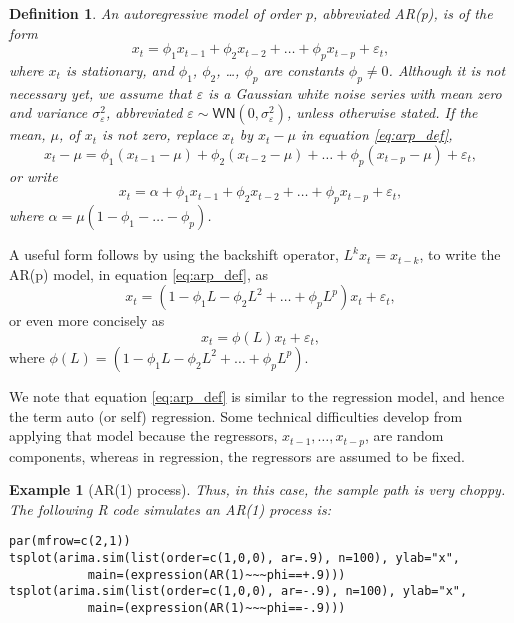 \documentclass[
paper=128mm:96mm, %
fontsize=9.5pt, %
pagesize, %
parskip=half-, %
]{scrartcl} %
\theoremstyle{mythmstyle} %
\newtheorem{definition}[theorem]{Definition} %
\newtheorem{example}[theorem]{Example} %
\begin{document}
\begin{definition}
An autoregressive model of order $p$, abbreviated AR(p), is of the form
%
\begin{equation}
\label{eq:arp_def}
x_t=\phi_1x_{t-1}+\phi_2x_{t-2} +\dots+\phi_px_{t-p} +\varepsilon_t,
\end{equation}
%
where $x_t$ is stationary, and $\phi_1$, $\phi_2$, \dots, $\phi_p$ are constants $\phi_p\neq 0$. 
%
Although it is not necessary yet, we assume that $\varepsilon$ is a Gaussian white noise series with mean zero and variance $\sigma_\varepsilon^2$, abbreviated $\varepsilon\sim\mathsf{WN}\left(0,\sigma_\varepsilon^2\right)$, unless otherwise stated. If the mean, $\mu$, of $x_t$ is not zero, replace $x_t$ by $x_t-\mu$ in equation \eqref{eq:arp_def},
%
\begin{equation}
\label{eq:arp_def_demean}
x_t-\mu=\phi_1\left(x_{t-1}-\mu\right)+\phi_2\left(x_{t-2}-\mu\right) +\dots+\phi_p\left(x_{t-p}-\mu\right)+\varepsilon_t,
\end{equation}
%
or write
%
\begin{equation}
\label{eq:arp_def_2}
x_t=\alpha+\phi_1x_{t-1}+\phi_2x_{t-2} +\dots+\phi_px_{t-p} +\varepsilon_t,
\end{equation}
%
where $\alpha=\mu\left(1-\phi_1-\dots-\phi_p\right)$.
\end{definition}
\clearpage

A useful form follows by using the backshift operator, $L^k x_t = x_{t-k}$, to write the AR(p) model, in equation \eqref{eq:arp_def}, as
%
\begin{equation*}
x_t=\left(1-\phi_1L-\phi_2 L^2+\dots+\phi_pL^p\right)x_t+\varepsilon_t,
\end{equation*}
%
or even more concisely as
%
\begin{equation*}
x_t=\phi\left(L\right)x_t+\varepsilon_t,
\end{equation*}
%
where $\phi\left(L\right)=\left(1-\phi_1L-\phi_2 L^2+\dots+\phi_pL^p\right)$.

We note that equation \eqref{eq:arp_def} is similar to the regression model, and hence the term auto (or self) regression. Some technical difficulties develop from applying that model because the regressors, $x_{t-1},\dots,x_{t-p}$, are random components, whereas in regression, the regressors are assumed to be fixed. 
\clearpage


\begin{example}[AR(1) process]

Thus, in this case, the sample path is very choppy. The following R code simulates an AR(1) process is:

\begin{lstlisting}[belowskip=-0.8 \baselineskip]
par(mfrow=c(2,1))
tsplot(arima.sim(list(order=c(1,0,0), ar=.9), n=100), ylab="x",
           main=(expression(AR(1)~~~phi==+.9)))
tsplot(arima.sim(list(order=c(1,0,0), ar=-.9), n=100), ylab="x",
           main=(expression(AR(1)~~~phi==-.9)))
\end{lstlisting}
\end{example}
\clearpage
\end{document}
